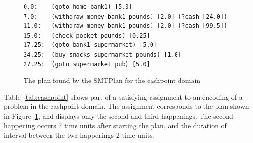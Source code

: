 \begin{figure}[thb]
\small
\begin{verbatim}
0.0:	(goto home bank1) [5.0]
7.0:	(withdraw_money bank1 pounds) [2.0] (?cash [24.0])
11.0:	(withdraw_money bank1 pounds) [2.0] (?cash [99.5])
15.0:	(check_pocket pounds) [0.25]
17.25:	(goto bank1 supermarket) [5.0]
24.25:	(buy_snacks supermarket pounds) [1.0]
27.25:	(goto supermarket pub) [5.0]
\end{verbatim}
\caption{The plan found by the SMTPlan for the cashpoint domain}
\label{fig:cashpoint plan}
\end{figure}

Table~\ref{tab:cashpoint} shows part of a satisfying assignment to an encoding of a problem in the cashpoint domain. The assignment corresponds to the plan shown in Figure~\ref{fig:cashpoint plan}, and displays only the second and third happenings. The second happening occurs 7 time units after starting the plan, and the duration of interval between the two happenings 2 time units.

